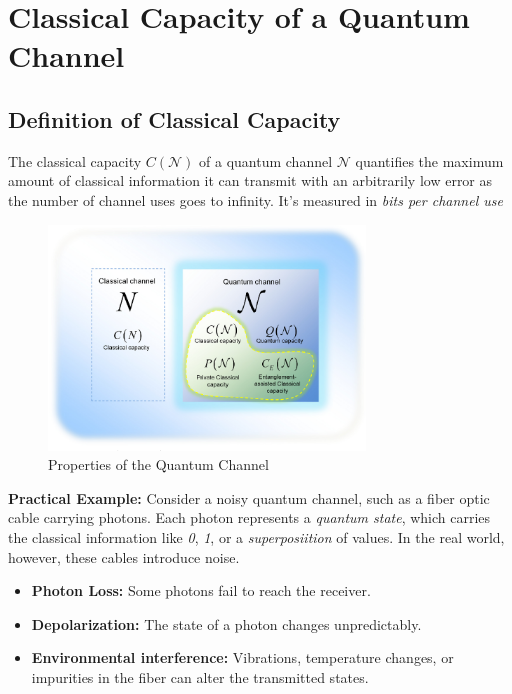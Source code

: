 \section{Classical Capacity of a Quantum Channel}

\subsection{Definition of Classical Capacity}
The classical capacity \( C(\mathcal{N}) \)  of a quantum channel \( \mathcal{N} \) quantifies the maximum amount of classical information it can transmit with an arbitrarily low error as the number of channel uses goes to infinity. It's measured in \textit{bits per channel use}

\begin{figure}[H]
    \centering
    \includegraphics[width=0.75\textwidth]{figures/properties_channels.png}
    \caption{Properties of the Quantum Channel \cite{Gyongyosi2012PropertiesOT}}
\end{figure}

\textbf{Practical Example:} Consider a noisy quantum channel, such as a fiber optic cable carrying photons. Each photon represents a \textit{quantum state}, which carries the classical information like \textit{0}, \textit{1}, or a \textit{superposiition} of values. In the real world, however, these cables introduce noise. 
\begin{itemize}
    \item \textbf{Photon Loss:} Some photons fail to reach the receiver.
    \item  \textbf{Depolarization:} The state of a photon changes unpredictably.
    \item \textbf{Environmental interference:} Vibrations, temperature changes, or impurities in the fiber can alter the transmitted states.
\end{itemize}

